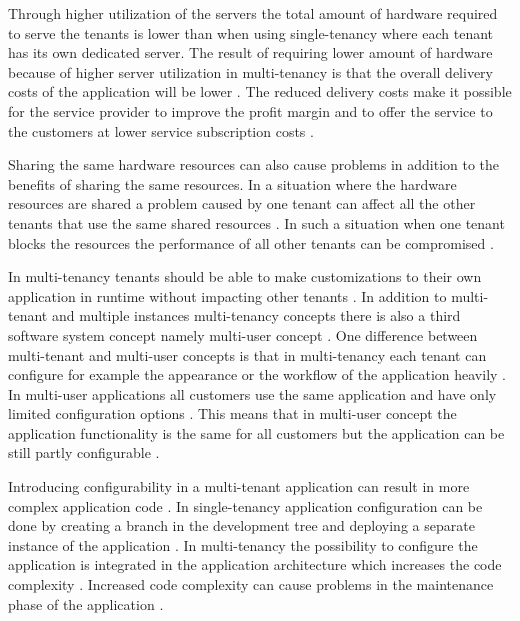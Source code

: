 \documentclass[conference]{sasmoota2017}
\begin{document}
Through higher utilization of the servers the total amount of hardware required to serve the tenants is lower than when using single-tenancy where each tenant has its own dedicated server. The result of requiring lower amount of hardware because of higher server utilization in multi-tenancy is that the overall delivery costs of the application will be lower \cite{Bezemer:2010:MaintenanceDream}. The reduced delivery costs make it possible for the service provider to improve the profit margin and to offer the service to the customers at lower service subscription costs \cite{Guo:2007:FrameworkForNative}.

Sharing the same hardware resources can also cause problems in addition to the benefits of sharing the same resources. In a situation where the hardware resources are shared a problem caused by one tenant can affect all the other tenants that use the same shared resources \cite{Bezemer:2010:EnablingMultiTenancy}. In such a situation when one tenant blocks the resources the performance of all other tenants can be compromised \cite{Bezemer:2010:MaintenanceDream}. 

In multi-tenancy tenants should be able to make customizations to their own application in runtime without impacting other tenants \cite{Guo:2007:FrameworkForNative}. In addition to multi-tenant and multiple instances multi-tenancy concepts there is also a third software system concept namely multi-user concept \cite{Bezemer:2010:MaintenanceDream}. One difference between multi-tenant and multi-user concepts is that in multi-tenancy each tenant can configure for example the appearance or the workflow of the application heavily \cite{Bezemer:2010:MaintenanceDream}. In multi-user applications all customers use the same application and have only limited configuration options \cite{Bezemer:2010:MaintenanceDream}. This means that in multi-user concept the application functionality is the same for all customers but the application can be still partly configurable \cite{Kabbedijk2015:Defining}. 

Introducing configurability in a multi-tenant application can result in more complex application code \cite{Bezemer:2010:EnablingMultiTenancy}. In single-tenancy application configuration can be done by creating a branch in the development tree and deploying a separate instance of the application \cite{Bezemer:2010:MaintenanceDream}. In multi-tenancy the possibility to configure the application is integrated in the application architecture which increases the code complexity \cite{Bezemer:2010:MaintenanceDream}. Increased code complexity can cause problems in the maintenance phase of the application \cite{Bezemer:2010:MaintenanceDream}. 
\end{document}
